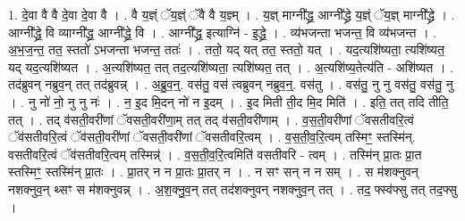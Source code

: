 \documentclass[17pt]{extarticle}
\begin{document}
1. दे॒वा वै वै दे॒वा दे॒वा वै । . वै य॒ज्ञ्ं ॅय॒ज्ञ्ं ॅवै वै य॒ज्ञ्म् । . य॒ज्ञ् माग्नी᳚द्ध्र॒ आग्नी᳚द्ध्रे य॒ज्ञ्ं ॅय॒ज्ञ् माग्नी᳚द्ध्रे । . आग्नी᳚द्ध्रे॒ वि व्याग्नी᳚द्ध्र॒ आग्नी᳚द्ध्रे॒ वि । . आग्नी᳚द्ध्र॒ इत्याग्नि॑ - इ॒द्ध्रे॒ । . व्य॑भजन्ता भजन्त॒ वि व्य॑भजन्त । . अ॒भ॒ज॒न्त॒ तत॒ स्ततो॑ ऽभजन्ता भजन्त॒ ततः॑ । . ततो॒ यद् यत् तत॒ स्ततो॒ यत् । . यद॒त्यशि॑ष्यता॒ त्यशि॑ष्यत॒ यद् यद॒त्यशि॑ष्यत । . अ॒त्यशि॑ष्यत॒ तत् तद॒त्यशि॑ष्यता॒ त्यशि॑ष्यत॒ तत् । . अ॒त्यशि॑ष्य॒तेत्य॑ति - अशि॑ष्यत । . तद॑ब्रुवन् नब्रुव॒न् तत् तद॑ब्रुवन्न् । . अ॒ब्रु॒व॒न्॒. वस॑तु॒ वस॑ त्वब्रुवन् नब्रुव॒न्॒. वस॑तु । . वस॑तु॒ नु नु वस॑तु॒ वस॑तु॒ नु । . नु नो॑ नो॒ नु नु नः॑ । . न॒ इ॒द मि॒दन् नो॑ न इ॒दम् । . इ॒द मिती ती॒द मि॒द मिति॑ । . इति॒ तत् तदि तीति॒ तत् । . तद् व॑सती॒वरी॑णां ॅवसती॒वरी॑णा॒म् तत् तद् व॑सती॒वरी॑णाम् । . व॒स॒ती॒वरी॑णां ॅवसतीवरि॒त्वं ॅव॑सतीवरि॒त्वं ॅव॑सती॒वरी॑णां ॅवसती॒वरी॑णां ॅवसतीवरि॒त्वम् । . व॒स॒ती॒व॒रि॒त्वम् तस्मिꣳ॒॒ स्तस्मि॑न्. वसतीवरि॒त्वं ॅव॑सतीवरि॒त्वम् तस्मिन्न्॑ । . व॒स॒ती॒व॒रि॒त्वमिति॑ वसतीवरि - त्वम् । . तस्मि॑न् प्रा॒तः प्रा॒त स्तस्मिꣳ॒॒ स्तस्मि॑न् प्रा॒तः । . प्रा॒तर् न न प्रा॒तः प्रा॒तर् न । . न सꣳ सन् न न सम् । . स म॑शक्नुवन् नशक्नुव॒न् थ्सꣳ स म॑शक्नुवन्न् । . अ॒श॒क्नु॒व॒न् तत् तद॑शक्नुवन् नशक्नुव॒न् तत् । . तद॒ फ्स्व॑फ्सु तत् तद॒फ्सु । \newline
\end{document}
